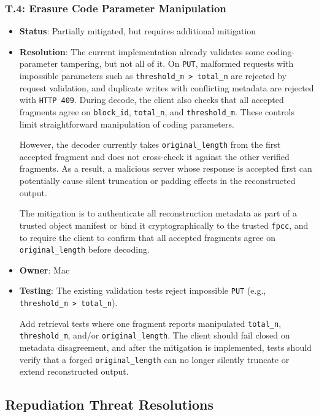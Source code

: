 \documentclass[../veristore_security_model.tex]{subfiles}
\begin{document}
\subsubsection{T.4: Erasure Code Parameter Manipulation}
\begin{itemize}
    \item \textbf{Status}: Partially mitigated, but requires additional mitigation
    \item \textbf{Resolution}: The current implementation already validates some coding-parameter tampering, but not all of it. On \texttt{PUT}, malformed requests with impossible parameters such as \texttt{threshold\_m > total\_n} are rejected by request validation, and duplicate writes with conflicting metadata are rejected with \texttt{HTTP 409}. During decode, the client also checks that all accepted fragments agree on \texttt{block\_id}, \texttt{total\_n}, and \texttt{threshold\_m}. These controls limit straightforward manipulation of coding parameters. 
    
    However, the decoder currently takes \texttt{original\_length} from the first accepted fragment and does not cross-check it against the other verified fragments. As a result, a malicious server whose response is accepted first can potentially cause silent truncation or padding effects in the reconstructed output. 
    
    The mitigation is to authenticate all reconstruction metadata as part of a trusted object manifest or bind it cryptographically to the trusted \texttt{fpcc}, and to require the client to confirm that all accepted fragments agree on \texttt{original\_length} before decoding.
    \item \textbf{Owner}: Mac
    \item \textbf{Testing}: The existing validation tests reject impossible \texttt{PUT} (e.g., \texttt{threshold\_m > total\_n}). 
    
    Add retrieval tests where one fragment reports manipulated \texttt{total\_n}, \texttt{threshold\_m}, and/or \newline \texttt{original\_length}. The client should fail closed on metadata disagreement, and after the mitigation is implemented, tests should verify that a forged \texttt{original\_length} can no longer silently truncate or extend reconstructed output.
\end{itemize}

\subsection{Repudiation Threat Resolutions}
\end{document}
